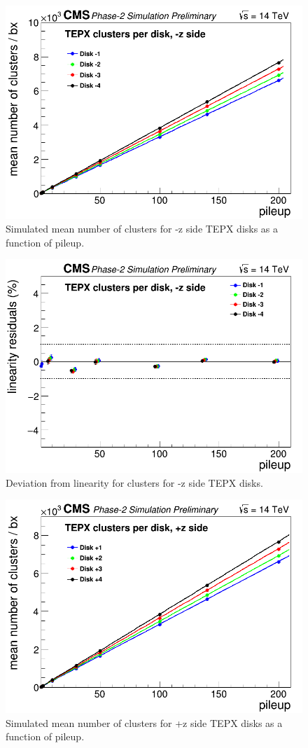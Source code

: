 \begin{figure}[H]
  \centering
  \includegraphics[width=0.5\columnwidth]{./TEPX_clusters_negativez_Linearity.png}
  \caption{Simulated mean number of clusters for -z side TEPX disks as a function of pileup.}
  \label{fig:CMS}
\end{figure}


\begin{figure}[H]
  \centering
  \includegraphics[width=0.5\columnwidth]{./TEPX_clusters_per_disk_negativez_Linearity_residuals.png}
  \caption{Deviation from linearity for clusters for -z side TEPX disks.}
  \label{fig:CMS}
\end{figure}

\begin{figure}[H]
  \centering
  \includegraphics[width=0.5\columnwidth]{./TEPX_clusters_per_disk_positivez_linearity.png}
  \caption{Simulated mean number of clusters for +z side TEPX disks as a function of pileup.}
  \label{fig:CMS}
\end{figure}


